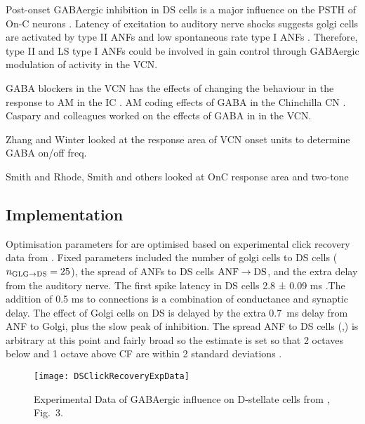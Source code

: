 \medskip{}

Post-onset GABAergic inhibition in DS cells is a major influence on the PSTH of
On-C neurons \citep{FerragamoGoldingEtAl:1998a,EvansZhao:1998}. Latency of
excitation to auditory nerve shocks suggests golgi cells are activated by type
II ANFs and low spontaneous rate type I ANFs \citep{BensonBerglundEtAl:1996,
  FerragamoGoldingEtAl:1998}. Therefore, type II and LS type I ANFs could be
involved in gain control through GABAergic modulation of activity in the VCN.

\medskip{}

 GABA blockers in the VCN has the
effects of changing the behaviour in the response to AM in the IC
\citep{CasparyPalombiEtAl:2002}.  AM coding effects of GABA in the Chinchilla CN
\citep{BackoffShadduckEtAl:1999}.  \citep{CasparyBackoffEtAl:1994} Caspary and
colleagues worked on the effects of GABA in in the VCN\@.

Zhang and Winter looked at the response area of VCN onset units to
determine GABA on/off freq. 

Smith and Rhode, Smith and others looked at OnC response area and two-tone



\subsection{Implementation}
 
Optimisation parameters for \GLGDS are optimised based on experimental
click recovery data from \citep{BackoffPalombiEtAl:1997}.  Fixed
parameters included the number of golgi cells to DS cells ($\protect n_{\protect\textrm{{GLG}}\to\textrm{{DS}}} =
25$), the spread of ANFs to DS cells $\protect\textrm{{ANF}}\to\textrm{{DS}}$, and the extra delay
from the auditory nerve.  The first spike latency in DS cells 2.8 ±
0.09 ms \citep{RhodeSmith:1986}.The addition of 0.5 ms to \ANFDS
connections is a combination of conductance and synaptic delay. The
effect of Golgi cells on DS is delayed by the extra 0.7~ms delay from
ANF to Golgi, plus the slow peak of \GABAa inhibition.  The spread ANF
to DS cells (\sANFDSh,\sANFDSl) is arbitrary at this point and fairly
broad so the estimate is set so that 2 octaves below and 1 octave
above CF are within 2 standard deviations \citep{PaoliniClark:1999}.

\begin{figure}[htb]
\centering
\texttt{[image: DSClickRecoveryExpData]}
\caption{Experimental Data of GABAergic influence on D-stellate cells from
  \citep{BackoffPalombiEtAl:1997}, Fig.~3.}\label{fig:DSClickRecoveryExpData}
\end{figure}

